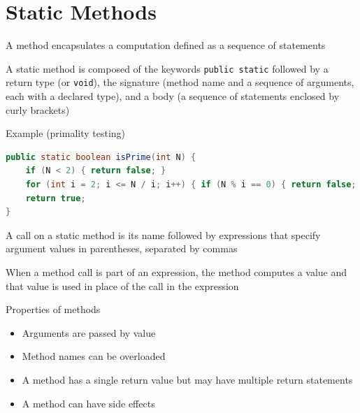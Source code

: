 \documentclass[8pt,a4paper,compress]{beamer}
\begin{document}
\section{Static Methods}
\begin{frame}[fragile]
\pause

A method encapsulates a computation defined as a sequence of statements

\pause\bigskip

A static method is composed of the keywords \lstinline{public static} followed by a return type (or \lstinline{void}), the signature (method name and a sequence of arguments, each with a declared type), and a body (a sequence of statements enclosed by curly brackets)

\pause\bigskip

Example (primality testing)

\smallskip

\begin{lstlisting}[language=Java,style=focusin]
public static boolean isPrime(int N) {
    if (N < 2) { return false; }
    for (int i = 2; i <= N / i; i++) { if (N % i == 0) { return false; } }
    return true;
}
\end{lstlisting}

\pause\bigskip

A call on a static method is its name followed by expressions that specify argument values in parentheses, separated by commas

\pause\bigskip

When a method call is part of an expression, the method computes a value and that value is used in place of the call in the expression

\pause\bigskip

Properties of methods
\begin{itemize}
\pause
\item Arguments are passed by value

\pause
\item Method names can be overloaded 

\pause
\item A method has a single return value but may have multiple return statements

\pause
\item A method can have side effects
\end{itemize}
\end{frame}
\end{document}
